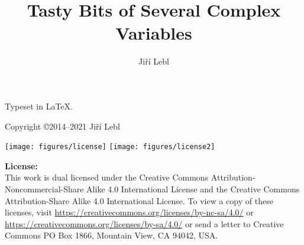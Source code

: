 \documentclass[12pt,openany]{book}
\author{Ji\v{r}\'i Lebl}
\title{Tasty Bits of Several Complex Variables}
\theoremstyle{plain}
\theoremstyle{remark}
\theoremstyle{definition}
\theoremstyle{exercise}
\theoremstyle{example}
\begin{document}
\ifpdf
\fi
\newlength{\centeroffset}
\setlength{\centeroffset}{-0.5\oddsidemargin}
\addtolength{\centeroffset}{0.5\evensidemargin}
\thispagestyle{empty}
\noindent\hspace*{\centeroffset}

\noindent\hspace*{\centeroffset}



\pagebreak

\vspace*{\fill}

\noindent
Typeset in \LaTeX.

\bigskip

\noindent
Copyright \copyright 2014--2021 Ji{\v r}\'i Lebl


\bigskip

\noindent
\texttt{[image: figures/license]}
\quad
\texttt{[image: figures/license2]}

\bigskip

\noindent
\textbf{License:}
\\
This work is dual licensed under
the Creative Commons
Attribution-Non\-commercial-Share Alike 4.0 International License and
the Creative Commons
Attribution-Share Alike 4.0 International License.
To view a
copy of these licenses, visit
\url{https://creativecommons.org/licenses/by-nc-sa/4.0/}
or
\url{https://creativecommons.org/licenses/by-sa/4.0/}
or send a letter to
Creative Commons
PO Box 1866, Mountain View, CA 94042, USA\@.
\end{document}
